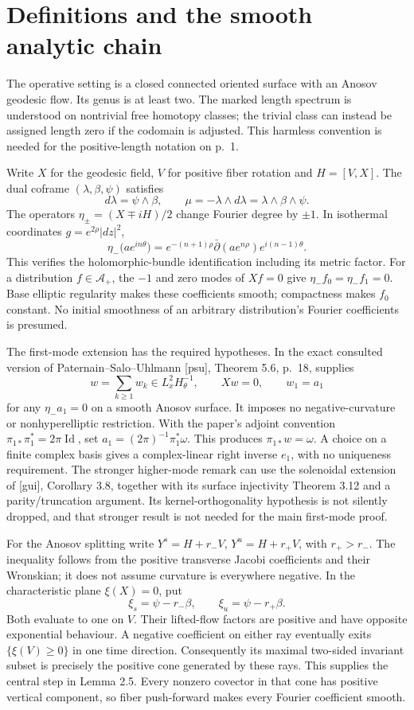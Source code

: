 \documentclass[10pt]{article}
\begin{document}
\section*{Definitions and the smooth analytic chain}
The operative setting is a closed connected oriented surface with an Anosov geodesic flow. Its genus is at least two. The marked length spectrum is understood on nontrivial free homotopy classes; the trivial class can instead be assigned length zero if the codomain is adjusted. This harmless convention is needed for the positive-length notation on p. 1.\par
Write \(X\) for the geodesic field, \(V\) for positive fiber rotation and \(H=[V,X]\). The dual coframe \((\lambda,\beta,\psi)\) satisfies \[d\lambda=\psi\wedge\beta,\qquad
 \mu=-\lambda\wedge d\lambda=\lambda\wedge\beta\wedge\psi.\] The operators \(\eta_\pm=(X\mp iH)/2\) change Fourier degree by \(\pm1\). In isothermal coordinates \(g=e^{2\rho}|dz|^2\), \[\eta_-\bigl(ae^{in\theta}\bigr)
 =e^{-(n+1)\rho}\bar\partial(ae^{n\rho})e^{i(n-1)\theta}.\] This verifies the holomorphic-bundle identification including its metric factor. For a distribution \(f\in\mathcal A_+\), the \(-1\) and zero modes of \(Xf=0\) give \(\eta_-f_0=\eta_-f_1=0\). Base elliptic regularity makes these coefficients smooth; compactness makes \(f_0\) constant. No initial smoothness of an arbitrary distribution’s Fourier coefficients is presumed.\par
The first-mode extension has the required hypotheses. In the exact consulted version of Paternain–Salo–Uhlmann [psu], Theorem 5.6, p. 18, supplies \[w=\sum_{k\ge1}w_k\in L_x^2H_\theta^{-1},\qquad
 Xw=0,\qquad w_1=a_1\] for any \(\eta_-a_1=0\) on a smooth Anosov surface. It imposes no negative-curvature or nonhyperelliptic restriction. With the paper’s adjoint convention \(\pi_{1*}\pi_1^*=2\pi\operatorname{Id}\), set \(a_1=(2\pi)^{-1}\pi_1^*\omega\). This produces \(\pi_{1*}w=\omega\). A choice on a finite complex basis gives a complex-linear right inverse \(e_1\), with no uniqueness requirement. The stronger higher-mode remark can use the solenoidal extension of [gui], Corollary 3.8, together with its surface injectivity Theorem 3.12 and a parity/truncation argument. Its kernel-orthogonality hypothesis is not silently dropped, and that stronger result is not needed for the main first-mode proof.\par
For the Anosov splitting write \(Y^s=H+r_-V\), \(Y^u=H+r_+V\), with \(r_+>r_-\). The inequality follows from the positive transverse Jacobi coefficients and their Wronskian; it does not assume curvature is everywhere negative. In the characteristic plane \(\xi(X)=0\), put \[\xi_s=\psi-r_-\beta,\qquad \xi_u=\psi-r_+\beta.\] Both evaluate to one on \(V\). Their lifted-flow factors are positive and have opposite exponential behaviour. A negative coefficient on either ray eventually exits \(\{\xi(V)\ge0\}\) in one time direction. Consequently its maximal two-sided invariant subset is precisely the positive cone generated by these rays. This supplies the central step in Lemma 2.5. Every nonzero covector in that cone has positive vertical component, so fiber push-forward makes every Fourier coefficient smooth.\par
\end{document}
